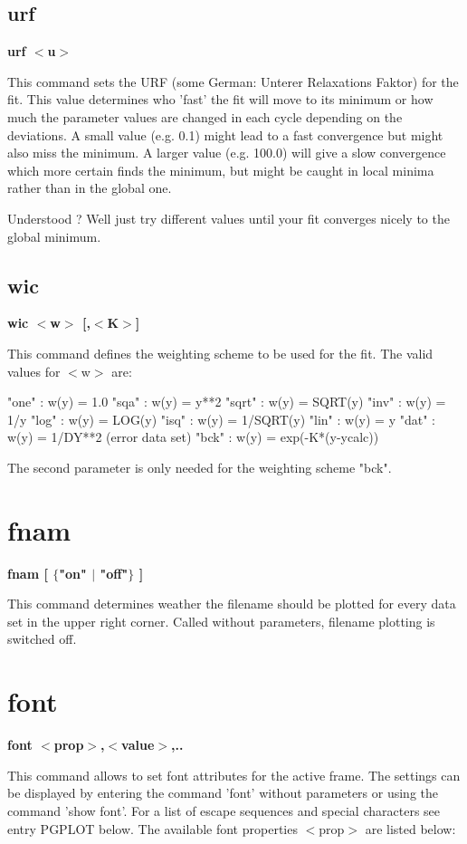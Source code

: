 \subsection*{urf}
{\bf urf $ <$u$> $ \par }
\par
\vspace{3pt}
This command sets the URF (some German: Unterer Relaxations Faktor) 
for the fit. This value determines who 'fast' the fit will move to 
its minimum or how much the parameter values are changed in each 
cycle depending on the deviations. A small value (e.g. 0.1) might 
lead to a fast convergence but might also miss the minimum. A larger 
value (e.g. 100.0) will give a slow convergence which more certain 
finds the minimum, but might be caught in local minima rather than in 
the global one. 
\par
Understood ? Well just try different values until your fit converges 
nicely to the global minimum. 
\subsection*{wic}
{\bf wic $ <$w$> $ [,$ <$K$> $] \par }
\par
\vspace{3pt}
This command defines the weighting scheme to be used for the fit. The 
valid values for $ <$w$> $ are: 
\par
\begin{MacVerbatim}
  "one"  : w(y) = 1.0              "sqa"  : w(y) = y**2
  "sqrt" : w(y) = SQRT(y)          "inv"  : w(y) = 1/y
  "log"  : w(y) = LOG(y)           "isq"  : w(y) = 1/SQRT(y)
  "lin"  : w(y) = y                "dat"  : w(y) = 1/DY**2 (error data set)
  "bck"  : w(y) = exp(-K*(y-ycalc))
\end{MacVerbatim}
The second parameter is only needed for the weighting scheme "bck". 
\section{fnam}
{\bf fnam [ $ \{$"on" $| $ "off"$\} $ ] \par }
\par
\vspace{3pt}
This command determines weather the filename should be plotted for 
every data set in the upper right corner. Called without parameters, 
filename plotting is switched off. 
\section{font}
{\bf font $ <$prop$> $,$ <$value$> $,.. \par }
\par
\vspace{3pt}
This command allows to set font attributes for the active frame. 
The settings can be displayed by entering the command 'font' 
without parameters or using the command 'show font'. For a list 
of escape sequences and special characters see entry PGPLOT below. 
The available font properties $ <$prop$> $ are listed below: 
\par
